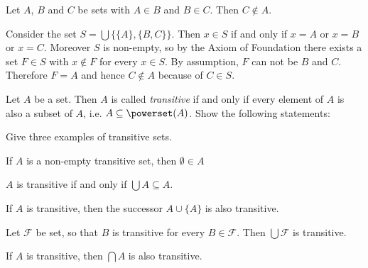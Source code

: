 \begin{exercise}
    Let $A$, $B$ and $C$ be sets with $A\in B$ and $B\in C$. Then $C\notin A$.
\end{exercise}
\begin{solution}
    Consider the set $S=\bigcup\{\{A\},\{B,C\}\}$. Then $x\in S$ if and only if $x=A$ or $x=B$ or $x=C$. Moreover $S$ is non-empty, so by the Axiom of Foundation there exists a set $F\in S$ with $x\notin F$ for every $x\in S$. By assumption, $F$ can not be $B$ and $C$. Therefore $F=A$ and hence $C\notin A$ because of $C\in S$.
\end{solution}

\begin{exercise}
    Let $A$ be a set. Then $A$ is called \emph{transitive} if and only if every element of $A$ is also a subset of $A$, i.e. $A\subseteq \powerset(A)$. Show the following statements:
    \begin{exerciseenumerate}
        \item Give three examples of transitive sets.
        \item If $A$ is a non-empty transitive set, then $\emptyset\in A$
        \item $A$ is transitive if and only if $\bigcup A\subseteq A$.
        \item If $A$ is transitive, then the successor $A\cup\{A\}$ is also transitive.
        \item Let $\mathcal F$ be set, so that $B$ is transitive for every $B\in\mathcal F$. Then $\bigcup\mathcal F$ is transitive.
        \item If $A$ is transitive, then $\bigcap A$ is also transitive.
    \end{exerciseenumerate}
\end{exercise}

